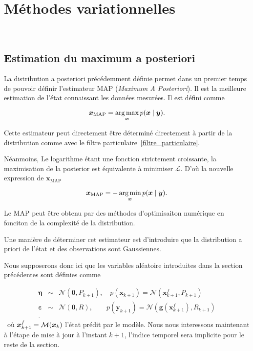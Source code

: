 \section{Méthodes variationnelles}~\label{sec:variation}
\subsection{Estimation du maximum a posteriori}

La distribution a posteriori précédemment définie permet dans un premier temps de pouvoir définir l'estimateur MAP (\textit{Maximum A Posteriori}). Il est la meilleure estimation de l'état connaissant les données mesurées. Il est défini comme

\begin{equation*}
    \bm x_{\text{MAP}} = \operatorname*{arg\,max}_{\bm x} p(\bm x \mid \bm y).
\end{equation*}

Cette estimateur peut directement être déterminé directement à partir de la distribution comme avec le filtre particulaire~\ref{filtre_particulaire}.

Néanmoins, Le logarithme étant une fonction strictement croissante, la maximisation de la posterior est équivalente à minimiser $\mathcal L$. D'où la nouvelle expression de $\bm x_{\text{MAP}}$

\begin{equation*}
    \bm x_{\text{MAP}} = - \operatorname*{arg\,min}_{\bm x} p(\bm x \mid \bm y).
\end{equation*}

Le MAP peut être obtenu par des méthodes d'optimisaiton numérique en fonciton de la complexité de la distribution.

Une manière de déterminer cet estimateur est d'introduire que la distribution a priori de l'état et des observations sont Gaussiennes.

Nous supposerons donc ici que les variables aléatoire introduites dans la section précédentes sont définies comme

\begin{eqnarray*}
    \bm \eta &\sim& \mathcal{N}(\bm 0, P_{k+1}), \quad p(\bm x_{k+1}) = \mathcal{N}(\bm x_{k+1}^f, P_{k+1})\\
    \bm \varepsilon & \sim & \mathcal N(\bm 0, R), \quad \quad p(\bm y_{k+1}) = \mathcal{N}(\bm g(\bm x_{k+1}^f) , R_{k+1})\\.
\end{eqnarray*}~où $\bm x_{k+1}^f = \mathcal{M}(\bm{x}_{k})$ l'état prédit par le modèle. Nous nous interessons maintenant à l'étape de mise à jour à l'instant $k+1$, l'indice temporel sera implicite pour le reste de la section.

